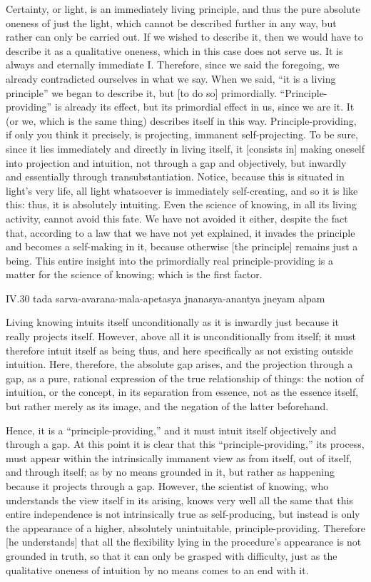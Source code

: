Certainty, or light, is an immediately living principle,
and thus the pure absolute oneness of just the light,
which cannot be described further in any way,
but rather can only be carried out.
If we wished to describe it, then we would have to
describe it as a qualitative oneness,
which in this case does not serve us.
It is always and eternally immediate I.
Therefore, since we said the foregoing,
we already contradicted ourselves in what we say.
When we said, “it is a living principle”
we began to describe it, but [to do so] primordially.
“Principle-providing” is already its effect,
but its primordial effect in us, since we are it.
It (or we, which is the same thing) describes itself in this way.
Principle-providing, if only you think it precisely, is
projecting, immanent self-projecting.
To be sure, since it lies immediately and directly in living itself,
it [consists in] making oneself into projection and intuition,
not through a gap and objectively,
but inwardly and essentially through transubstantiation.
Notice, because this is situated in light's very life,
all light whatsoever is immediately self-creating,
and so it is like this:
thus, it is absolutely intuiting.
Even the science of knowing, in all its living activity,
cannot avoid this fate.
We have not avoided it either, despite the fact that,
according to a law that we have not yet explained,
it invades the principle and becomes a self-making in it,
because otherwise [the principle] remains just a being.
This entire insight into
the primordially real principle-providing is
a matter for the science of knowing;
which is the first factor.

IV.30
tada sarva-avarana-mala-apetasya jnanasya-anantya jneyam alpam

Living knowing intuits itself
unconditionally as it is inwardly
just because it really projects itself.
However, above all it is unconditionally from itself;
it must therefore intuit itself as being thus,
and here specifically as not existing outside intuition.
Here, therefore, the absolute gap arises,
and the projection through a gap,
as a pure, rational expression
of the true relationship of things:
the notion of intuition,
or the concept,
in its separation from essence,
not as the essence itself,
but rather merely as its image,
and the negation of the latter beforehand.

Hence, it is a “principle-providing,”
and it must intuit itself objectively and through a gap.
At this point it is clear that this “principle-providing,”
its process, must appear within the intrinsically immanent view as
from itself, out of itself, and through itself;
as by no means grounded in it, but rather as happening
because it projects through a gap.
However, the scientist of knowing,
who understands the view itself in its arising,
knows very well all the same that this entire independence is
not intrinsically true as self-producing,
but instead is only the appearance of a higher,
absolutely unintuitable, principle-providing.
Therefore [he understands] that all the flexibility
lying in the procedure's appearance is not grounded in truth,
so that it can only be grasped with difficulty,
just as the qualitative oneness of intuition
by no means comes to an end with it.

